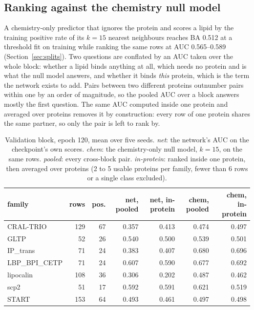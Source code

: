 \subsection{Ranking against the chemistry null model}

A chemistry-only predictor that ignores the protein and scores a lipid by the training
positive rate of its $k = 15$ nearest neighbours reaches BA 0.512 at a threshold fit on training
while ranking the same rows at AUC 0.565--0.589 (Section~\ref{sec:splits}). Two questions
are conflated by an AUC taken over the whole block: whether a lipid binds
anything at all, which needs no protein and is what the null model answers, and whether
it binds \emph{this} protein, which is the term the network exists to add. Pairs between
two different proteins outnumber pairs within one by an order of magnitude, so the
pooled AUC over a block answers mostly the first question. The same AUC computed inside
one protein and averaged over proteins removes it by construction: every row of one
protein shares the same partner, so only the pair is left to rank by.

\begin{table}[htbp]
\centering
\begin{tabular}{lrrrrrr}
\hline
family & rows & pos. & net, pooled & net, in-protein & chem, pooled & chem, in-protein \\
\hline
CRAL-TRIO & 129 & 67 & 0.357 & 0.413 & 0.474 & 0.497 \\
GLTP & 52 & 26 & 0.540 & 0.500 & 0.539 & 0.501 \\
IP\_trans & 71 & 24 & 0.383 & 0.407 & 0.680 & 0.696 \\
LBP\_BPI\_CETP & 71 & 24 & 0.607 & 0.590 & 0.677 & 0.692 \\
lipocalin & 108 & 36 & 0.306 & 0.202 & 0.487 & 0.462 \\
scp2 & 51 & 17 & 0.592 & 0.591 & 0.621 & 0.519 \\
START & 153 & 64 & 0.493 & 0.461 & 0.497 & 0.498 \\
\hline
\end{tabular}
\caption{Validation block, epoch 120, mean over five seeds. \emph{net}: the network's AUC
on the checkpoint's own scores. \emph{chem}: the chemistry-only null model, $k=15$, on the
same rows. \emph{pooled}: every cross-block pair. \emph{in-protein}: ranked inside one
protein, then averaged over proteins (2 to 5 usable proteins per family, fewer than 6
rows or a single class excluded).}
\label{tab:randaucvalid}
\end{table}

